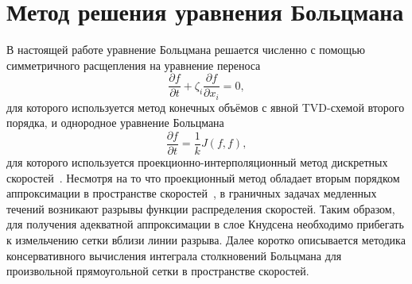 \documentclass[
aps,%
12pt,%
final,%
notitlepage,%
oneside,%
onecolumn,%
nobibnotes,%
nofootinbib,%
superscriptaddress,%
noshowpacs,%
centertags]%
{revtex4}
\newcommand{\pder}[2][]{\frac{\partial#1}{\partial#2}}
\begin{document}
\section{Метод решения уравнения Больцмана}

В настоящей работе уравнение Больцмана решается численно с помощью
симметричного расщепления на уравнение переноса
\begin{equation}\label{eq:split_advection}
    \pder[f]{t} + \zeta_i\pder[f]{x_i} = 0,
\end{equation}
для которого используется метод конечных объёмов с явной TVD-схемой второго порядка,
и однородное уравнение Больцмана
\begin{equation}\label{eq:split_integral}
    \pder[f]{t} = \frac1k J(f,f),
\end{equation}
для которого используется проекционно-интерполяционный метод дискретных скоростей~\cite{Tcheremissine1997, Tcheremissine2006}.
Несмотря на то что проекционный метод обладает вторым порядком аппроксимации в пространстве скоростей~\cite{Anikin2012},
в граничных задачах медленных течений возникают разрывы функции распределения скоростей.
Таким образом, для получения адекватной аппроксимации в слое Кнудсена необходимо прибегать
к измельчению сетки вблизи линии разрыва.
Далее коротко описывается методика консервативного вычисления интеграла столкновений Больцмана
для произвольной прямоугольной сетки в пространстве скоростей.
\end{document}
